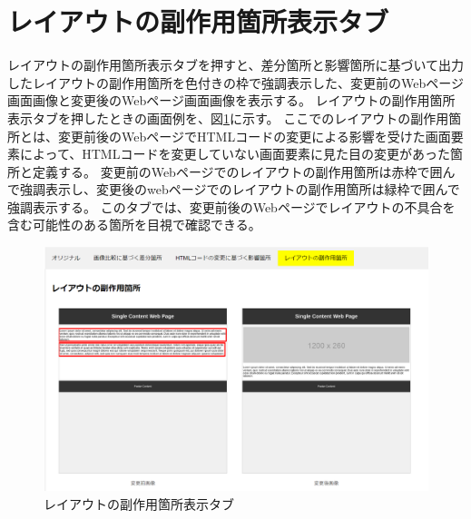 \section{レイアウトの副作用箇所表示タブ}\label{subsec:subeffect_tab}
レイアウトの副作用箇所表示タブを押すと、差分箇所と影響箇所に基づいて出力したレイアウトの副作用箇所を色付きの枠で強調表示した、変更前のWebページ画面画像と変更後のWebページ画面画像を表示する。
レイアウトの副作用箇所表示タブを押したときの画面例を、図\ref{fig: Appearance_subEffect_tab}に示す。
ここでのレイアウトの副作用箇所とは、変更前後のWebページでHTMLコードの変更による影響を受けた画面要素によって、HTMLコードを変更していない画面要素に見た目の変更があった箇所と定義する。
変更前のWebページでのレイアウトの副作用箇所は赤枠で囲んで強調表示し、変更後のwebページでのレイアウトの副作用箇所は緑枠で囲んで強調表示する。
このタブでは、変更前後のWebページでレイアウトの不具合を含む可能性のある箇所を目視で確認できる。
\begin{figure}[tp]
	\begin{center}
		\includegraphics[width=1.0\columnwidth]{image/3_subEffect_tab.png}
		\caption{レイアウトの副作用箇所表示タブ}
		\label{fig: Appearance_subEffect_tab}
	\end{center}
\end{figure}


